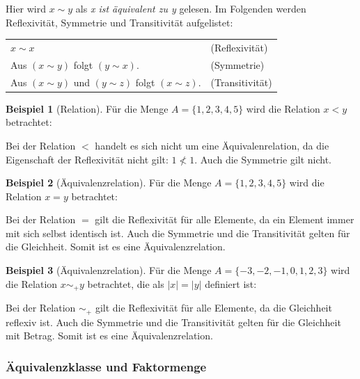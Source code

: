 \documentclass[12pt,a4paper, usenames, dvipsnames]{article}
\theoremstyle{mystyle}
\theoremstyle{definition}
\newtheorem{bsp}{Beispiel}[definition]
\begin{document}
Hier wird $x \sim y$ als \textit{x ist äquivalent zu y} gelesen. Im Folgenden werden Reflexivität, Symmetrie und Transitivität aufgelistet:

\begin{center}
\begin{tabular}{ll}
$x \sim x$ & (Reflexivität) \\
Aus $(x \sim y)$ folgt $(y \sim x)$. & (Symmetrie) \\
Aus $(x \sim y)$ und $(y \sim z)$ folgt $(x \sim z)$. & (Transitivität) \\
\end{tabular}
\end{center}


\begin{bsp}[Relation]


Für die Menge $A=\{ 1, 2, 3, 4, 5 \}$ wird die Relation $ x < y$ betrachtet:

Bei der Relation $< $ handelt es sich nicht um eine Äquivalenrelation, da die Eigenschaft der Reflexivität nicht gilt: $1 \nless 1$. Auch die Symmetrie gilt nicht.


\end{bsp}
\begin{bsp}[Äquivalenzrelation]
Für die Menge $A=\{ 1, 2, 3, 4, 5 \}$ wird die Relation $ x = y$ betrachtet:

Bei der Relation $=$ gilt die Reflexivität für alle Elemente, da ein Element immer mit sich selbst identisch ist. Auch die Symmetrie und die Transitivität gelten für die Gleichheit. Somit ist es eine Äquivalenzrelation. 


\end{bsp}

\begin{bsp}[Äquivalenzrelation]
Für die Menge $A=\{ -3, -2, -1, 0, 1, 2, 3 \}$ wird die Relation $x \sim_+ y$ betrachtet, die als $|x| =|y|$ definiert ist:

Bei der Relation $\sim_+$ gilt die Reflexivität für alle Elemente, da die Gleichheit reflexiv ist. Auch die Symmetrie und die Transitivität gelten für die Gleichheit mit Betrag. Somit ist es eine Äquivalenzrelation. 


\end{bsp}

\subsubsection*{Äquivalenzklasse und Faktormenge} 
\label{Abschnitt_FaktormengenUndÄquivalenzklasse}
\end{document}
